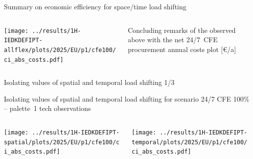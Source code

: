 \begin{frame}{Summary on economic efficiency for space/time load shifting}

  {\footnotesize
  \vspace{0.2cm}
  
  \begin{columns}
  \begin{column}{8cm}
  \centering

  \texttt{[image: ../results/1H-IEDKDEFIPT-allflex/plots/2025/EU/p1/cfe100/ci\_abs\_costs.pdf]}
  \end{column}
  
  \begin{column}{7cm}
    \centering
    Concluding remarks of the observed above with the net 24/7~CFE procurement annual costs plot [\euro/a]
    
    \end{column}
  \end{columns}
  
  }
\end{frame}


\begin{frame}{Isolating values of spatial and temporal load shifting 1/3}

  {\footnotesize
  Isolating values of spatial and temporal load shifting for scenario 24/7 CFE 100\% -- palette~1 tech
  \newline
  observations
  \newline

  \begin{columns}
    \begin{column}{7.5cm}
    \texttt{[image: ../results/1H-IEDKDEFIPT-spatial/plots/2025/EU/p1/cfe100/ci\_abs\_costs.pdf]}
    \end{column}
    
    \begin{column}{7.5cm}
    \texttt{[image: ../results/1H-IEDKDEFIPT-temporal/plots/2025/EU/p1/cfe100/ci\_abs\_costs.pdf]}
    \end{column}
  \end{columns}

  }
  
\end{frame}


